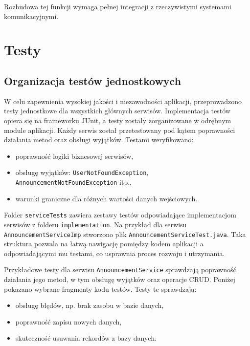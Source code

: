 \noindent Rozbudowa tej funkcji wymaga pełnej integracji z rzeczywistymi systemami komunikacyjnymi.






\section{Testy}
\subsection{Organizacja testów jednostkowych}
W celu zapewnienia wysokiej jakości i niezawodności aplikacji, przeprowadzono testy jednostkowe dla wszystkich głównych serwisów. Implementacja testów opiera się na frameworku JUnit, a testy zostały zorganizowane w odrębnym module aplikacji. Każdy serwis został przetestowany pod kątem poprawności działania metod oraz obsługi wyjątków. Testami weryfikowano:
\begin{itemize}
    \item poprawność logiki biznesowej serwisów,
    \item obsługę wyjątków: \texttt{UserNotFoundException}, \texttt{AnnouncementNotFoundException} itp.,
    \item warunki graniczne dla różnych wartości danych wejściowych.
\end{itemize}

Folder \texttt{serviceTests} zawiera zestawy testów odpowiadające implementacjom serwisów z folderu \texttt{implementation}. Na przykład dla serwisu \texttt{AnnouncementServiceImp} stworzono plik \texttt{AnnouncementServiceTest.java}. Taka struktura pozwala na łatwą nawigację pomiędzy kodem aplikacji a odpowiadającymi mu testami, co usprawnia proces rozwoju i utrzymania.

Przykładowe testy dla serwisu \texttt{AnnouncementService} sprawdzają poprawność działania jego metod, w tym obsługę wyjątków oraz operacje CRUD. Poniżej pokazano wybrane fragmenty kodu testów. Testy te sprawdzają:
\begin{itemize}
    \item obsługę błędów, np. brak zasobu w bazie danych,
    \item poprawność zapisu nowych danych,
    \item skuteczność usuwania rekordów z bazy danych.
\end{itemize}

